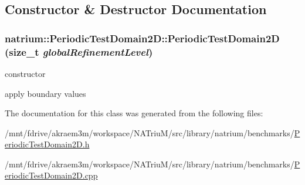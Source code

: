 \subsection{Constructor \& Destructor Documentation}
\hypertarget{classnatrium_1_1PeriodicTestDomain2D_a930da37a3e1be744aaf59e27ba956318}{
\subsubsection[{PeriodicTestDomain2D}]{\setlength{\rightskip}{0pt plus 5cm}natrium::PeriodicTestDomain2D::PeriodicTestDomain2D (size\_\-t {\em globalRefinementLevel})}}
\label{classnatrium_1_1PeriodicTestDomain2D_a930da37a3e1be744aaf59e27ba956318}


constructor 

apply boundary values 

The documentation for this class was generated from the following files:\begin{DoxyCompactItemize}
\item 
/mnt/fdrive/akraem3m/workspace/NATriuM/src/library/natrium/benchmarks/\hyperlink{PeriodicTestDomain2D_8h}{PeriodicTestDomain2D.h}\item 
/mnt/fdrive/akraem3m/workspace/NATriuM/src/library/natrium/benchmarks/\hyperlink{PeriodicTestDomain2D_8cpp}{PeriodicTestDomain2D.cpp}\end{DoxyCompactItemize}

